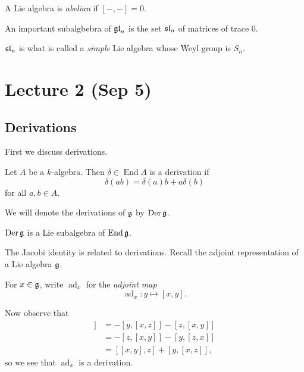 \documentclass[twoside, 10pt]{article}
\begin{document}
    \begin{defn}
        A Lie algebra is \textit{abelian} if $[-,-] = 0$.
    \end{defn}

    \begin{exm}
        An important subalgbebra of $\mathfrak{gl}_n$ is the set $\mathfrak{sl}_n$ of matrices of trace $0$.
    \end{exm}

    \begin{rmk}
        $\mathfrak{sl}_n$ is what is called a \textit{simple} Lie algebra whose Weyl group is $S_n$.
    \end{rmk}

    \section{Lecture 2 (Sep 5)}%
    \label{sec:lecture_2_sep_5_}
    
    \subsection{Derivations}%
    \label{sub:derivations}
    
    
    First we discuss derivations.

    \begin{defn}
        Let $A$ be a $k$-algebra. Then $\delta \in \operatorname{End} A$ is a derivation if \[\delta(ab) = \delta(a)b+a\delta(b)\] for all $a,b \in A$.
    \end{defn}

    We will denote the derivations of $\mathfrak{g}$ by $\operatorname{Der} \mathfrak{g}$.

    \begin{rmk}
        $\operatorname{Der} \mathfrak{g}$ is a Lie subalgebra of $\operatorname{End}{\mathfrak{g}}$.
    \end{rmk}

    The Jacobi identity is related to derivations. Recall the adjoint representation of a Lie algebra $\mathfrak{g}$.

    \begin{defn}
        For $x \in \mathfrak{g}$, write $\operatorname{ad}_x$ for the \textit{adjoint map} \[\operatorname{ad}_x: y \mapsto [x,y].\]
    \end{defn}

    Now observe that 
    \begin{align*}
        [x,[y,z]] &= -[y,[x,z]] - [z,[x,y]] \\
                  &= -[z,[x,y]] - [y,[z,x]] \\
                  &= [[x,y],z] + [y, [x,z]],
    \end{align*}
    so we see that $\operatorname{ad}_x$ is a derivation.
\end{document}
